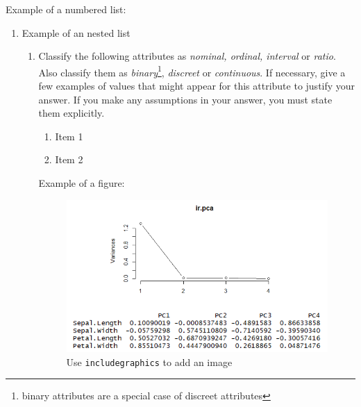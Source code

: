 \documentclass{article}
\begin{document}
Example of a numbered list:
\begin{enumerate}

\item Example of an nested list

\begin{enumerate}

    \item Classify the following attributes as \emph{nominal, ordinal, interval} or \emph{ratio}. Also classify them as \emph{binary}\footnote{ binary attributes are a special case of discreet attributes},  \emph{discreet} or  \emph{continuous}. If necessary, give a few examples of values that might appear for this attribute to justify your answer. If you make any assumptions in your answer, you must state them explicitly. 
    \begin{enumerate}  
        \item Item 1
        \item Item 2
    \end{enumerate}

    Example of a figure:
    \begin{figure}[H]
    \centering
    \includegraphics[width=12cm]{PCA1.png}
    \caption{Use \texttt{includegraphics} to add an image}
    \label{PCA1}
    \end{figure}


\end{enumerate}
\end{enumerate}
\end{document}
